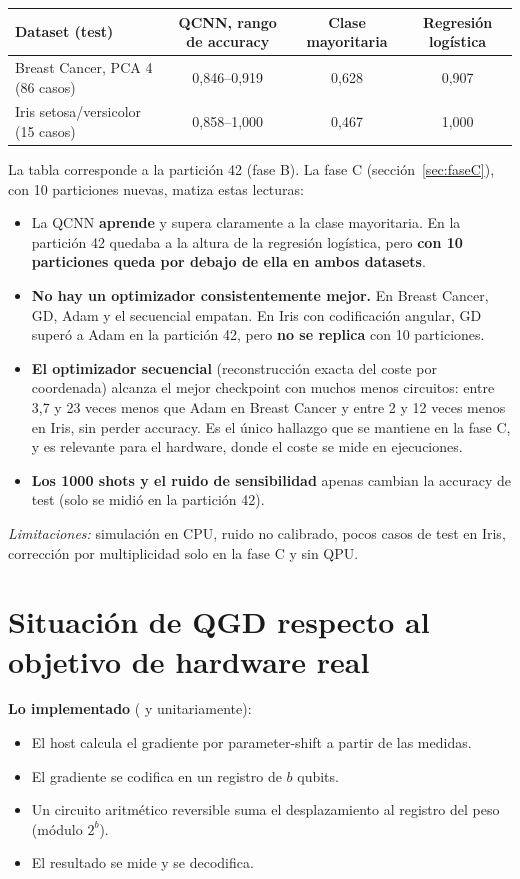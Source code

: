 \documentclass[11pt,a4paper]{article}
\begin{document}
\begin{table}[H]
\centering\small
\begin{tabular}{lccc}
\toprule
Dataset (test) & QCNN, rango de accuracy & Clase mayoritaria & Regresión logística \\
\midrule
Breast Cancer, PCA 4 (86 casos) & 0,846--0,919 & 0,628 & 0,907 \\
Iris setosa/versicolor (15 casos) & 0,858--1,000 & 0,467 & 1,000 \\
\bottomrule
\end{tabular}
\end{table}

La tabla corresponde a la partición 42 (fase B). La fase C (sección~\ref{sec:faseC}), con 10 particiones nuevas, matiza estas lecturas:
\begin{itemize}
  \item La QCNN \textbf{aprende} y supera claramente a la clase mayoritaria. En la partición 42 quedaba a la altura de
        la regresión logística, pero \textbf{con 10 particiones queda por debajo de ella en ambos datasets}.
  \item \textbf{No hay un optimizador consistentemente mejor.} En Breast Cancer, GD, Adam y el secuencial empatan. En
        Iris con codificación angular, GD superó a Adam en la partición 42, pero \textbf{no se replica} con 10 particiones.
  \item \textbf{El optimizador secuencial} (reconstrucción exacta del coste por coordenada) alcanza el mejor checkpoint
        con muchos menos circuitos: entre 3,7 y 23 veces menos que Adam en Breast Cancer y entre 2 y 12 veces menos en
        Iris, sin perder accuracy. Es el único hallazgo que se mantiene en la fase C, y es relevante para el hardware,
        donde el coste se mide en ejecuciones.
  \item \textbf{Los 1000 shots y el ruido de sensibilidad} apenas cambian la accuracy de test (solo se midió en la
        partición 42).
\end{itemize}
\textit{Limitaciones:} simulación en CPU, ruido no calibrado, pocos casos de test en Iris, corrección por
multiplicidad solo en la fase C y sin QPU.

\section{Situación de QGD respecto al objetivo de hardware real}

\textbf{Lo implementado} ( y  unitariamente):
\begin{itemize}
  \item El host calcula el gradiente por parameter-shift a partir de las medidas.
  \item El gradiente se codifica en un registro de $b$ qubits.
  \item Un circuito aritmético reversible suma el desplazamiento al registro del peso (módulo $2^b$).
  \item El resultado se mide y se decodifica.
\end{itemize}
\end{document}
